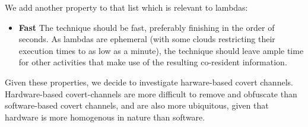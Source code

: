 \noindent We add another property to that list which is relevant to lambdas:
\begin{itemize}
    \item \textbf{Fast} The technique should be fast, preferably finishing in 
    the order of seconds. As lambdas are ephemeral (with some clouds restricting their 
    execution times to as low as a minute), the technique should leave ample time 
    for other activities that make use of the resulting co-resident information.
\end{itemize}


Given these properties, we decide to investigate harware-based covert channels.
Hardware-based covert-channels are more difficult to remove and obfuscate than
software-based covert channels, and are also more ubiquitous, given that
hardware is more homogenous in nature than software. 



